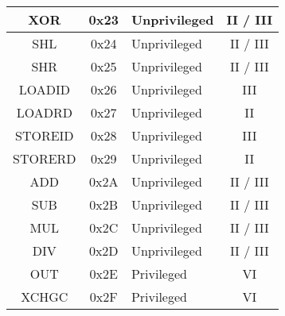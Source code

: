 \begin{tabular}{ | c | c | l | c | }
	\hline
	XOR & 0x23 & Unprivileged & II / III\\
	\hline
	SHL & 0x24 & Unprivileged & II / III\\
	\hline
	SHR & 0x25 & Unprivileged & II / III\\
	\hline
	LOADID & 0x26 & Unprivileged & III \\
	\hline
	LOADRD & 0x27 & Unprivileged & II \\
	\hline
	STOREID & 0x28 & Unprivileged & III \\
	\hline
	STORERD & 0x29 & Unprivileged & II \\
	\hline
	ADD & 0x2A & Unprivileged & II / III\\
	\hline
	SUB & 0x2B & Unprivileged & II / III\\
	\hline
	MUL & 0x2C & Unprivileged & II / III\\
	\hline
	DIV & 0x2D & Unprivileged & II / III\\
	\hline
	OUT & 0x2E & Privileged & VI\\
	\hline
	XCHGC & 0x2F & Privileged & VI \\
	\hline
\end{tabular}
